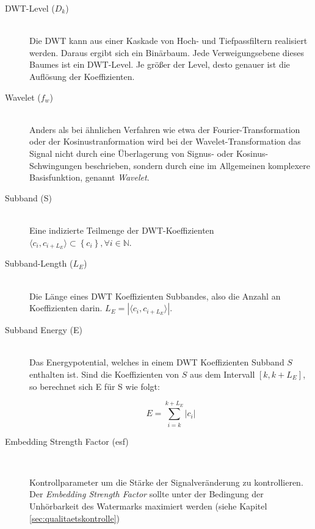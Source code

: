 \begin{description}
\item[DWT-Level (${D}_{k}$)] \hfill \\

Die DWT kann aus einer Kaskade von Hoch- und Tiefpassfiltern realisiert werden. Daraus ergibt sich ein Binärbaum. Jede Verweigungsebene dieses Baumes ist ein DWT-Level. Je größer der Level, desto genauer ist die Auflösung der Koeffizienten. 

\item[Wavelet (${f}_{w}$)] \hfill \\
Anders als bei \"ahnlichen Verfahren wie etwa der Fourier-\-Transformation oder der Kosinus\-tranformation wird bei der Wavelet-Transformation das Signal nicht durch eine Überlagerung von Signus- oder Kosinus-Schwingungen beschrieben, sondern durch eine im Allgemeinen komplexere Basisfunktion, genannt \textit{Wavelet}.
	
\item[Subband (S)] \hfill \\ 
Eine indizierte Teilmenge der DWT-Koeffizienten $\langle{c}_{i},{c}_{i+{L}_{E}}\rangle \subset \left\{{c}_{i}\right\}, \forall i \in \mathbb{N}$. 
	
\item[Subband-Length (${L}_{E}$)] \hfill \\ 
Die L\"ange eines DWT Koeffizienten Subbandes, also die Anzahl an Koeffizienten darin. ${L}_{E} = |\langle{c}_{i},{c}_{i+{L}_{E}}\rangle|$.

\item[Subband Energy (E)] \hfill \\
Das Energypotential, welches in einem DWT Koeffizienten Subband $S$ enthalten ist. Sind die Koeffizienten von $S$ aus dem Intervall $[k, k+{L}_{E}]$, so berechnet sich E f\"ur S wie folgt:
	
	\begin{equation}
		E = \sum\limits_{i=k}^{k+{L}_{E}}|c_i| \label{equ:energy}
	\end{equation}
	
\item[Embedding Strength Factor (esf)] \hfill \\ 

Kontrollparameter um die Stärke der Signalveränderung zu kontrollieren. Der \textit{Embedding Strength Factor} sollte unter der Bedingung der Unhörbarkeit des Watermarks maximiert werden (siehe Kapitel \ref{sec:qualitaetskontrolle})
	

\end{description}
